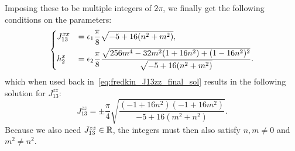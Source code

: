 Imposing these to be multiple integers of $2\pi$, we finally get the following conditions on the parameters:
\begin{equation}
\begin{dcases}%
    J_{13}^{xx} &= \epsilon_1\frac{\pi}{8}\sqrt{-5+16(n^2+m^2)}, \\
    h_2^x       &= \epsilon_2\frac{\pi}{8} \frac{
        \sqrt{256 m^4 - 32 m^2 (1 + 16n^2) + (1 - 16 n^2)^2}
    }{
        \sqrt{-5+16(n^2+m^2)}
    }.
\end{dcases}
\end{equation}
which when used back in~\cref{eq:fredkin_J13zz_final_sol} results in the following solution for $J_{13}^{zz}$:
\begin{equation}
    J_{13}^{zz} =
    \pm \frac{\pi}{4}
    \sqrt{\frac{
        (-1 + 16 n^2)(-1 + 16 m^2)
    }{
        -5 + 16 (m^2 + n^2)
    }}.
\end{equation}
Because we also need $J_{13}^{zz}\in\mathbb{R}$, the integers must then also satisfy  $n,m\neq0$ and $m^2\neq n^2$.

